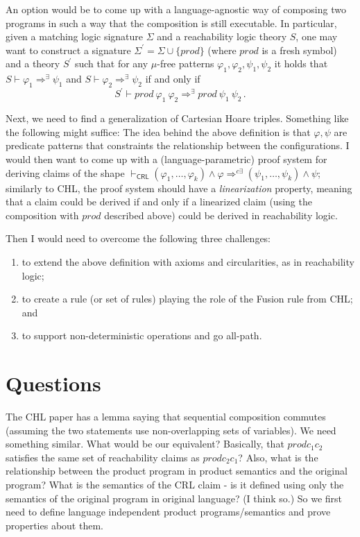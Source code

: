 \documentclass{article}
\newcommand{\CRL}{\mathsf{CRL}}
\begin{document}
An option would be to come up with a language-agnostic way of composing two programs in such a way
that the composition is still executable.
In particular, given a matching logic signature $\Sigma$ and a reachability logic theory $S$, one may
want to construct a signature $\Sigma^\prime = \Sigma \cup \{ \mathit{prod} \}$
(where $\mathit{prod}$ is a fresh symbol)
and a theory $S^\prime$ such that for any $\mu$-free patterns $\varphi_1,\varphi_2,\psi_1,\psi_2$
it holds that $S \vdash \varphi_1 \Rightarrow^\exists \psi_1$ and
$S \vdash \varphi_2 \Rightarrow^\exists \psi_2$ if and only if
\begin{equation*}
S^\prime \vdash \mathit{prod}\ \varphi_1\ \varphi_2 \Rightarrow^\exists \mathit{prod}\ \psi_1\ \psi_2    \, .
\end{equation*}

Next, we need to find a generalization of Cartesian Hoare triples.
Something like the following might suffice:
The idea behind the above definition is that $\varphi,\psi$ are predicate patterns
that constraints the relationship between the configurations.
I would then want to come up with a (language-parametric) proof system
for deriving claims of the shape
$\vdash_\CRL (\varphi_1,\ldots,\varphi_k) \land \varphi \Rightarrow^{c\exists}
(\psi_1,\ldots,\psi_k) \land \psi$;
similarly to CHL, the proof system should have a \emph{linearization} property,
meaning that a claim could be derived if and only if
a linearized claim (using the composition with $\textit{prod}$ described above) could be derived in reachability logic.

Then I would need to overcome the following three challenges:
\begin{enumerate}
    \item to extend the above definition with axioms and circularities, as in reachability logic;
    \item to create a rule (or set of rules) playing the role of the Fusion rule from CHL; and
    \item to support non-deterministic operations and go all-path.
\end{enumerate}

\section{Questions}

The CHL paper has a lemma saying that sequential composition commutes (assuming the two statements use non-overlapping sets of variables).
We need something similar. What would be our equivalent? Basically, that
$\mathit{prod} c_1 c_2$ satisfies the same set of reachability claims as $\mathit{prod} c_2 c_1$?
Also, what is the relationship between the product program in product semantics and the original program? What is the semantics of the CRL claim - is it defined using only the semantics of the original program in original language? (I think so.) So we first need to define language independent product programs/semantics and prove properties about them.
\end{document}
